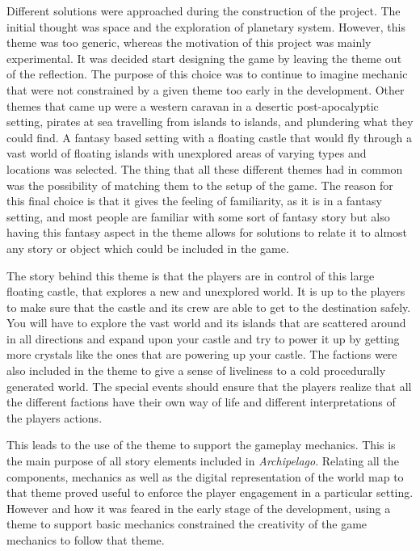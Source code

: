 Different solutions were approached during the construction of the project. The initial thought was space and the exploration of planetary system. However, this theme was too generic, whereas the motivation of this project was mainly experimental. It was decided start designing the game by leaving the theme out of the reflection. The purpose of this choice was to continue to imagine mechanic that were not constrained by a given theme too early in the development. Other themes that came up were a western caravan in a desertic post-apocalyptic setting, pirates at sea travelling from islands to islands, and plundering what they could find. A fantasy based setting with a floating castle that would fly through a vast world of floating islands with unexplored areas of varying types and locations was selected. The thing that all these different themes had in common was the possibility of matching them to the setup of the game. The reason for this final choice is that it gives the feeling of familiarity, as it is in a fantasy setting, and most people are familiar with some sort of fantasy story but also having this fantasy aspect in the theme allows for solutions to relate it to almost any story or object which could be included in the game. 

The story behind this theme is that the players are in control of this large floating castle, that explores a new and unexplored world. It is up to the players to make sure that the castle and its crew are able to get to the destination safely. You will have to explore the vast world and its islands that are scattered around in all directions and expand upon your castle and try to power it up by getting more crystals like the ones that are powering up your castle.
The factions were also included in the theme to give a sense of liveliness to a cold procedurally generated world. The special events should ensure that the players realize that all the different factions have their own way of life and different interpretations of the players actions. 

This leads to the use of the theme to support the gameplay mechanics. This is the main purpose of all story elements included in \textit{Archipelago}. Relating all the components, mechanics as well as the digital representation of the world map to that theme proved useful to enforce the player engagement in a particular setting. However and how it was feared in the early stage of the development, using a theme to support basic mechanics constrained the creativity of the game mechanics to follow that theme.


